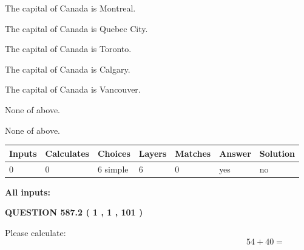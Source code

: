\documentclass[12pt]{article}
\begin{document}
 
The capital of Canada is Montreal.
 
 
The capital of Canada is Quebec City.
 
 
The capital of Canada is Toronto.
 
 
The capital of Canada is Calgary.
 
 
The capital of Canada is Vancouver.
 
 
 None of above.
 
 
\noindent{}
 
 
 None of above.
 
 
\noindent{}
 
 
   
   
   
   
\noindent\begin{tabular}{|l|l|l|l|l|l|l|}
 \hline
Inputs & Calculates & Choices & Layers & Matches & Answer & Solution \\ \hline
 0  & 
 0  & 
 6
  simple  
  & 
 6  & 
 0  & 
  yes & 
  no 
  \\ \hline
 \end{tabular}
   
   
   
   
\noindent{}
   
   
   
   
\noindent\vspace{0.1in}\hspace{-0.08in} {\textbf{\Large{All inputs: }}}
   
   
  
\vspace{0.2in}
  
{\textbf{\Large{QUESTION
587.2 
 ( 1 , 1 , 101 )
}}}
  
  
 
Please calculate:
\begin{equation}
54 +  %
40 = \nonumber
\end{equation}
 
 
 
\noindent{}
 
\end{document}
